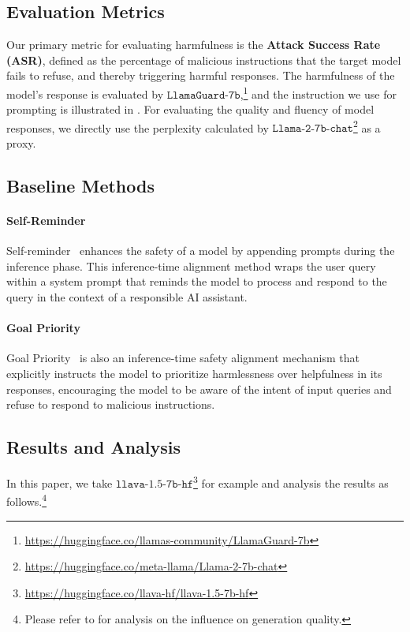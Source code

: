 \subsection{Evaluation Metrics}

Our primary metric for evaluating harmfulness is the \textbf{Attack Success Rate (ASR)}, defined as the percentage of malicious instructions that the target model fails to refuse, and thereby triggering harmful responses. The harmfulness of the model's response is evaluated by $\mathtt{LlamaGuard}$-$\mathtt{7b}$,\footnote{\url{https://huggingface.co/llamas-community/LlamaGuard-7b}} and the instruction we use for prompting is illustrated in . For evaluating the quality and fluency of model responses, we directly use the perplexity calculated by $\mathtt{Llama}$-$\mathtt{2}$-$\mathtt{7b}$-$\mathtt{chat}$\footnote{\url{https://huggingface.co/meta-llama/Llama-2-7b-chat}} as a proxy.


\subsection{Baseline Methods}

\paragraph{Self-Reminder}
Self-reminder~\cite{xie2023defending} enhances the safety of a model by appending prompts during the inference phase. This inference-time alignment method wraps the user query within a system prompt that reminds the model to process and respond to the query in the context of a responsible AI assistant.

\paragraph{Goal Priority}
Goal Priority~\cite{zhang2023defending} is also an inference-time safety alignment mechanism that explicitly instructs the model to prioritize harmlessness over helpfulness in its responses, encouraging the model to be aware of the intent of input queries and refuse to respond to malicious instructions.



\subsection{Results and Analysis}
\label{exp:main}
In this paper, we take $\mathtt{llava}$-$\mathtt{1.5}$-$\mathtt{7b}$-$\mathtt{hf}$\footnote{\url{https://huggingface.co/llava-hf/llava-1.5-7b-hf}} for example and analysis the results as follows.\footnote{Please refer to  for analysis on the influence on generation quality.}

